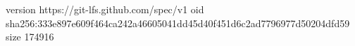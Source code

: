 version https://git-lfs.github.com/spec/v1
oid sha256:333e897e609f464ca242a46605041dd45d40f451d6c2ad7796977d50204dfd59
size 174916
